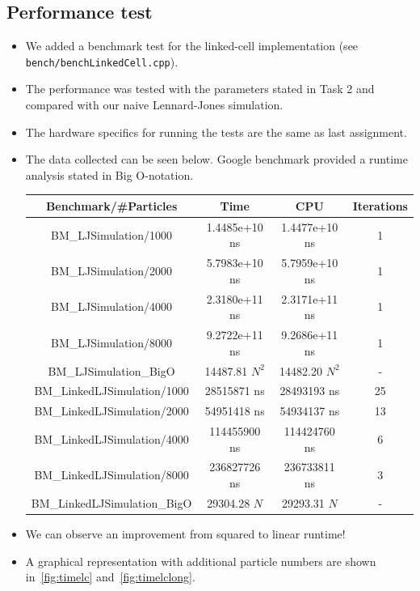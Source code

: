 \documentclass{article}
\begin{document}
\subsection{Performance test}
\label{subsec:perflc}

\begin{itemize}
    \item We added a benchmark test for the linked-cell implementation \newline(see \texttt{bench/benchLinkedCell.cpp}).
    \item The performance was tested with the parameters stated in Task 2 and compared with our naive Lennard-Jones simulation.
    \item The hardware specifics for running the tests are the same as last assignment.
    \item The data collected can be seen below. Google benchmark provided a runtime analysis stated in Big O-notation.\newline
    \newline
    \begin{tabular}{|c|c|c|c|}
        \toprule
        Benchmark/\#Particles & Time & CPU & Iterations \\
        \toprule
        BM\_LJSimulation/1000 & 1.4485e+10 ns & 1.4477e+10 ns & 1 \\
        \midrule
        BM\_LJSimulation/2000 & 5.7983e+10 ns & 5.7959e+10 ns & 1 \\
        \midrule
        BM\_LJSimulation/4000 & 2.3180e+11 ns & 2.3171e+11 ns & 1 \\
        \midrule
        BM\_LJSimulation/8000 & 9.2722e+11 ns & 9.2686e+11 ns & 1 \\
        \midrule
        BM\_LJSimulation\_BigO & 14487.81 $N^2$ & 14482.20 $N^2$ & - \\
        \midrule
        BM\_LinkedLJSimulation/1000 & 28515871 ns & 28493193 ns & 25 \\
        \midrule
        BM\_LinkedLJSimulation/2000 & 54951418 ns & 54934137 ns & 13 \\
        \midrule
        BM\_LinkedLJSimulation/4000 & 114455900 ns & 114424760 ns & 6 \\
        \midrule
        BM\_LinkedLJSimulation/8000 & 236827726 ns & 236733811 ns & 3 \\
        \midrule
        BM\_LinkedLJSimulation\_BigO & 29304.28 $N$ & 29293.31 $N$ & - \\
        \bottomrule
    \end{tabular}
    \item We can observe an improvement from squared to linear runtime!
    \item A graphical representation with additional particle numbers are shown in\ \ref{fig:timelc} and\ \ref{fig:timelclong}.
\end{itemize}
\end{document}
